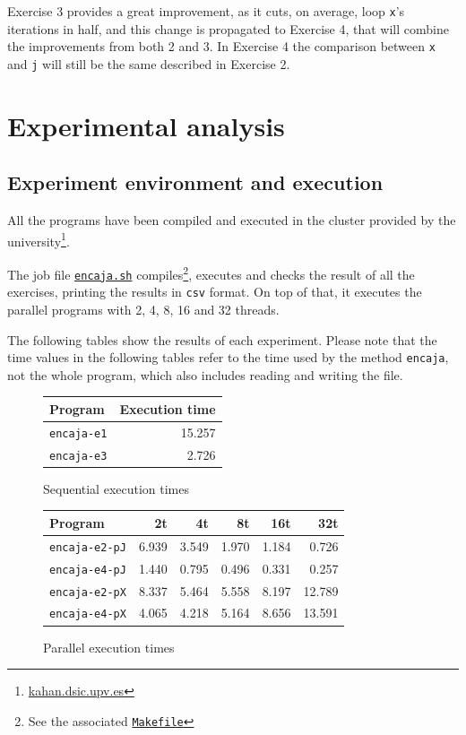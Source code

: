 \documentclass[a4paper]{article}
\newcommand{\github}{https://github.com/kauron/etsinf3/tree/master/CPA/lab2}
\newcommand{\gitname}[1]{\texttt{\href{\github /#1}{#1}}}
\begin{document}
Exercise 3 provides a great improvement, as it cuts, on average, loop \texttt{x}'s iterations in half, and this change is propagated to Exercise 4, that will combine the improvements from both 2 and 3. In Exercise 4 the comparison between \texttt{x} and \texttt{j} will still be the same described in Exercise 2.

\section{Experimental analysis}
\subsection{Experiment environment and execution}
All the programs have been compiled and executed in the cluster provided by the university\footnote{\url{kahan.dsic.upv.es}}.

The job file \gitname{encaja.sh} compiles\footnote{See the associated \gitname{Makefile}}, executes and checks the result of all the exercises, printing the results in \texttt{csv} format. On top of that, it executes the parallel programs with 2, 4, 8, 16 and 32 threads.

The following tables show the results of each experiment. Please note that the time values in the following tables refer to the time used by the method \texttt{encaja}, not the whole program, which also includes reading and writing the file.

\begin{figure}[h]
	\centering
	\begin{tabular}{l r}
		Program            & Execution time \\ \hline
		\texttt{encaja-e1} & 15.257         \\
		\texttt{encaja-e3} &  2.726         \\ \hline
	\end{tabular}
	\caption{Sequential execution times}
	\label{fig:table-time-seq}
\end{figure}
\begin{figure}[h]
	\centering
	\begin{tabular}{l r r r r r}
		Program               & 2t     & 4t    & 8t    & 16t   & 32t    \\ \hline
		\texttt{encaja-e2-pJ} & 6.939  & 3.549 & 1.970 & 1.184 &  0.726 \\
		\texttt{encaja-e4-pJ} & 1.440  & 0.795 & 0.496 & 0.331 &  0.257 \\
		\texttt{encaja-e2-pX} & 8.337  & 5.464 & 5.558 & 8.197 & 12.789 \\
		\texttt{encaja-e4-pX} & 4.065  & 4.218 & 5.164 & 8.656 & 13.591 \\ \hline
	\end{tabular}
	\caption{Parallel execution times}
	\label{fig:table-time}
\end{figure}
\newpage
\end{document}
